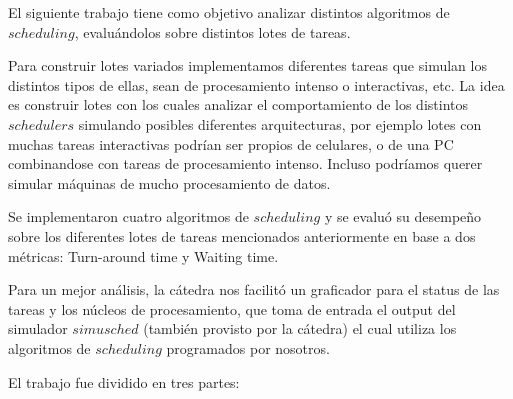 El siguiente trabajo tiene como objetivo analizar distintos algoritmos de $scheduling$, evaluándolos sobre distintos lotes de tareas. 

Para construir lotes variados implementamos diferentes tareas que simulan los distintos tipos de ellas, sean de procesamiento intenso o interactivas, etc. La idea es construir lotes con los cuales analizar el comportamiento de los distintos $schedulers$ simulando posibles diferentes arquitecturas, por ejemplo lotes con muchas tareas interactivas podrían ser propios de celulares, o de una PC combinandose con tareas de procesamiento intenso. Incluso podríamos querer simular máquinas de mucho procesamiento de datos.

Se implementaron cuatro algoritmos de $scheduling$ y se evaluó su desempeño sobre los diferentes lotes de tareas mencionados anteriormente en base a dos métricas: Turn-around time y Waiting time.

Para un mejor análisis, la cátedra nos facilitó un graficador para el status de las tareas y los núcleos de procesamiento, que toma de entrada el output del simulador $simusched$ (también provisto por la cátedra) el cual utiliza los algoritmos de $scheduling$ programados por nosotros.

El trabajo fue dividido en tres partes:
